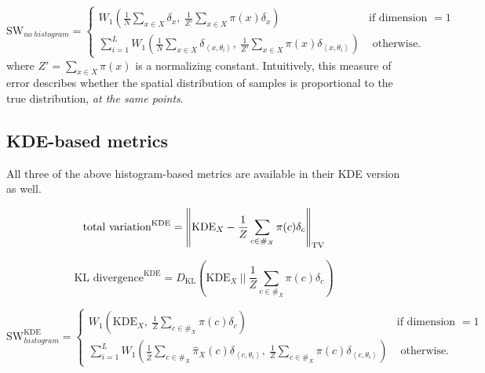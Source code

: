 \[\text{SW}_{no\ histogram} = \begin{cases}
W_1 \left( \frac 1 N \sum_{x \in X} \delta_x,\  \frac 1 {Z'} \sum_{x \in X} \pi(x) \delta_x \right) & \text{if dimension } = 1 \\
\sum_{i = 1}^L W_1 \left(  \frac 1 N \sum_{x \in X} \delta_{\left<x, \theta_i \right>},\ \frac 1 {Z'} \sum_{x \in X} \pi(x) \delta_{\left<x, \theta_i \right>}  \right) & \text{ otherwise. }
\end{cases}\]
where $Z' = \sum_{x \in X} \pi(x) $ is a normalizing constant. Intuitively, this measure of error describes whether the spatial distribution of samples is proportional to the true distribution, \textit{at the same points}.


\subsection{KDE-based metrics}

All three of the above histogram-based metrics are available in their KDE version as well. 

\[\text{total variation}^{\text{KDE}} = \norm{\text{KDE}_X - \frac 1 Z \sum_{c \in \#_X} \pi(c) \delta_c}_{\text{TV}} \]

\[\text{KL divergence}^{\text{KDE}} = D_{\text{KL}} \left(\text{KDE}_X \ \bigg|\bigg|\  \frac 1 Z \sum_{c \in \#_X} \pi(c) \delta_c\right) \]

\[\text{SW}_{histogram}^{\text{KDE}} = \begin{cases}
W_1 \left( \text{KDE}_X,\  \frac 1 Z \sum_{c \in \#_X} \pi(c) \delta_c \right) & \text{if dimension } = 1 \\
\sum_{i = 1}^L W_1 \left( \frac 1 {\hat Z} \sum_{c \in \#_X} \hat{\pi}_X(c) \delta_{\left<c, \theta_i \right>},\  \frac 1 Z \sum_{c \in \#_X} \pi(c) \delta_{\left<c, \theta_i \right>}  \right) & \text{ otherwise. }
\end{cases}\]